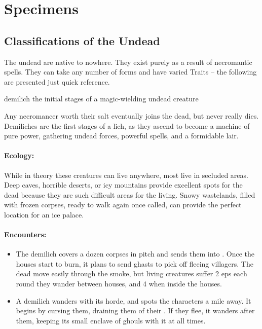 \section{Specimens}

\begin{multicols}{2}

\subsection{}

\subsection{Classifications of the Undead}

The undead are native to nowhere.
They exist purely as a result of necromantic spells.
They can take any number of forms and have varied Traits -- the following are presented just quick reference.

  {demilich}%
  {the initial stages of a magic-wielding undead creature}%

Any necromancer worth their salt eventually joins the dead, but never really dies.
Demiliches are the first stages of a lich, as they ascend to become a machine of pure power, gathering undead forces, powerful spells, and a formidable lair.

\paragraph{Ecology:} While in theory these creatures can live anywhere, most live in secluded areas.
Deep caves, horrible deserts, or icy mountains provide excellent spots for the dead because they are such difficult areas for the living.
Snowy wastelands, filled with frozen corpses, ready to walk again once called, can provide the perfect location for an ice palace.

\paragraph{Encounters:}

\begin{itemize}
  \item
  The demilich covers a dozen corpses in pitch and sends them into .
  Once the houses start to burn, it plans to send ghasts to pick off fleeing villagers.
  The dead move easily through the smoke, but living creatures suffer 2 \glspl{ep} each round they wander between houses, and 4 when inside the houses.
  \item
  A demilich wanders with its horde, and spots the characters a mile away.
  It begins by cursing them, draining them of their .
  If they flee, it wanders after them, keeping its small enclave of ghouls with it at all times.


\end{itemize}
\end{multicols}
